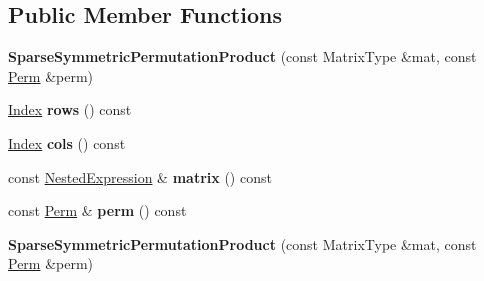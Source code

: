 \subsection*{Public Member Functions}
\begin{DoxyCompactItemize}
\item 
\mbox{\label{class_eigen_1_1_sparse_symmetric_permutation_product_a370dca4285a065f461d876c036b033bb}} 
{\bfseries Sparse\+Symmetric\+Permutation\+Product} (const Matrix\+Type \&mat, const \hyperlink{group___core___module}{Perm} \&perm)
\item 
\mbox{\label{class_eigen_1_1_sparse_symmetric_permutation_product_ae1536b801016aa3c8e30bc8fc2b668ae}} 
\hyperlink{group___core___module_a554f30542cc2316add4b1ea0a492ff02}{Index} {\bfseries rows} () const
\item 
\mbox{\label{class_eigen_1_1_sparse_symmetric_permutation_product_aaa3e6f4ec6b0b6e7d5ddd6b90fb315cf}} 
\hyperlink{group___core___module_a554f30542cc2316add4b1ea0a492ff02}{Index} {\bfseries cols} () const
\item 
\mbox{\label{class_eigen_1_1_sparse_symmetric_permutation_product_a4e413e198db04775095f311b387fb115}} 
const \hyperlink{group___sparse_core___module}{Nested\+Expression} \& {\bfseries matrix} () const
\item 
\mbox{\label{class_eigen_1_1_sparse_symmetric_permutation_product_a3b40313534a1f298e47bf4619891cd5f}} 
const \hyperlink{group___core___module}{Perm} \& {\bfseries perm} () const
\item 
\mbox{\label{class_eigen_1_1_sparse_symmetric_permutation_product_a370dca4285a065f461d876c036b033bb}} 
{\bfseries Sparse\+Symmetric\+Permutation\+Product} (const Matrix\+Type \&mat, const \hyperlink{group___core___module}{Perm} \&perm)
\item 
\mbox{\label{class_eigen_1_1_sparse_symmetric_permutation_product_ae1536b801016aa3c8e30bc8fc2b668ae}} 

\end{DoxyCompactItemize}
